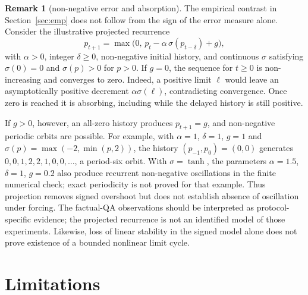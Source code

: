 \documentclass[11pt]{article}
\theoremstyle{definition}
\newtheorem{remark}{Remark}
\begin{document}
\begin{remark}[non-negative error and absorption]\label{rem:absorb}
The empirical contrast in Section~\ref{sec:emp} does not follow from the sign of the error measure
alone. Consider the illustrative projected recurrence
\[
  p_{t+1}=\max\!\big(0,\,p_t-\alpha\,\sigma(p_{t-\delta})+g\big),
\]
with $\alpha>0$, integer $\delta\ge0$, non-negative initial history, and continuous $\sigma$ satisfying
$\sigma(0)=0$ and $\sigma(p)>0$ for $p>0$. If $g=0$, the sequence for $t\ge0$ is non-increasing and converges to
zero. Indeed, a positive limit $\ell$ would leave an asymptotically positive decrement
$\alpha\sigma(\ell)$, contradicting convergence. Once zero is reached it is absorbing, including
while the delayed history is still positive.

If $g>0$, however, an all-zero history produces $p_{t+1}=g$, and non-negative periodic orbits are
possible. For example, with $\alpha=1$, $\delta=1$, $g=1$ and
$\sigma(p)=\max(-2,\min(p,2))$, the history $(p_{-1},p_0)=(0,0)$ generates
$0,0,1,2,2,1,0,0,\ldots$, a period-six orbit. With $\sigma=\tanh$, the parameters
$\alpha=1.5$, $\delta=1$, $g=0.2$ also produce recurrent non-negative oscillations in the
finite numerical check; exact periodicity is not proved for that example.
Thus projection removes signed overshoot but does not establish absence of oscillation under forcing.
The factual-QA observations should be interpreted as protocol-specific evidence; the projected
recurrence is not an identified model of those experiments. Likewise, loss of linear stability in
the signed model alone does not prove existence of a bounded nonlinear limit cycle.
\end{remark}

\section{Limitations}
\end{document}
